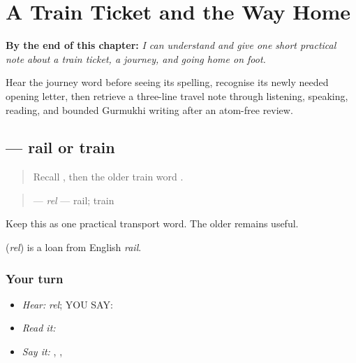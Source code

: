
\chapter{A Train Ticket and the Way Home}
\label{ch:pa-a2-transport-prerequisite}

\begin{chapteropening}
\textbf{By the end of this chapter:} \emph{I can understand and give one short practical note about a train ticket, a journey, and going home on foot.}

Hear the journey word before seeing its spelling, recognise its newly needed opening letter, then retrieve a three-line travel note through listening, speaking, reading, and bounded Gurmukhi writing after an atom-free review.
\end{chapteropening}

\section[\texorpdfstring{\pa{ਰੇਲ} (rel)}{ਰੇਲ (rel)}]{ — rail or train}

\label{lesson:PA-C181-rel}



\begin{quote}
Recall \textbf{}, then the older train word \textbf{}.
\end{quote}

\begin{grammarlens}[title={Grammar Lens: one transport word}]
\begin{quote}
\textbf{} — \emph{rel} — rail; train
\end{quote}

Keep this as one practical transport word. The older \textbf{} remains useful.
\end{grammarlens}

\begin{cousinweb}
\textbf{} (\emph{rel}) is a loan from English \emph{rail}.
\end{cousinweb}

\subsection*{Your turn}
\begin{itemize}
\raggedright
  \item \emph{Hear:} \emph{rel}; YOU SAY: \textbf{}
  \item \emph{Read it:} \textbf{}
  \item \emph{Say it:} \textbf{}, \textbf{}, \textbf{}
\end{itemize}

